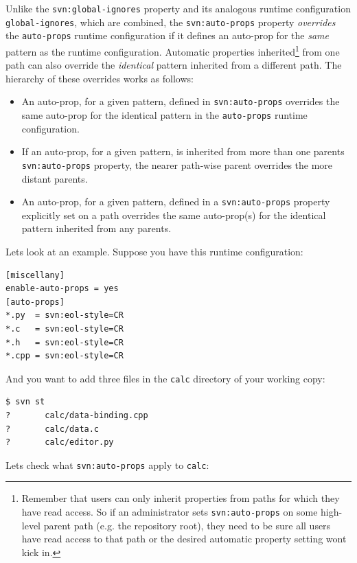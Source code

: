 Unlike the \texttt{svn:global-ignores} property and its analogous
runtime configuration \texttt{global-ignores}, which are combined, the
\texttt{svn:auto-props} property \emph{overrides} the
\texttt{auto-props} runtime configuration if it defines an auto-prop for
the \emph{same} pattern as the runtime configuration. Automatic
properties inherited\footnote{Remember that users can only inherit
  properties from paths for which they have read access. So if an
  administrator sets \texttt{svn:auto-props} on some high-level parent
  path (e.g. the repository root), they need to be sure all users have
  read access to that path or the desired automatic property setting
  won\textquotesingle t kick in.} from one path can also override the
\emph{identical} pattern inherited from a different path. The hierarchy
of these overrides works as follows:

\begin{itemize}
\item
  An auto-prop, for a given pattern, defined in \texttt{svn:auto-props}
  overrides the same auto-prop for the identical pattern in the
  \texttt{auto-props} runtime configuration.
\item
  If an auto-prop, for a given pattern, is inherited from more than one
  parents\textquotesingle{} \texttt{svn:auto-props} property, the nearer
  path-wise parent overrides the more distant parents.
\item
  An auto-prop, for a given pattern, defined in a
  \texttt{svn:auto-props} property explicitly set on a path overrides
  the same auto-prop(s) for the identical pattern inherited from any
  parents.
\end{itemize}

Let\textquotesingle s look at an example. Suppose you have this runtime
configuration:

\begin{verbatim}
[miscellany]
enable-auto-props = yes
[auto-props]
*.py  = svn:eol-style=CR
*.c   = svn:eol-style=CR
*.h   = svn:eol-style=CR
*.cpp = svn:eol-style=CR
\end{verbatim}

And you want to add three files in the \texttt{calc} directory of your
working copy:

\begin{verbatim}
$ svn st
?       calc/data-binding.cpp
?       calc/data.c
?       calc/editor.py
\end{verbatim}

Let\textquotesingle s check what \texttt{svn:auto-props} apply to
\texttt{calc}:

